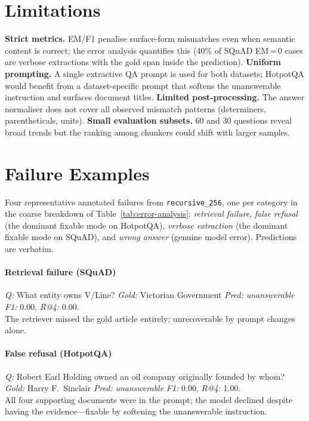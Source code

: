 \documentclass[11pt]{article}
\begin{document}
\section{Limitations}

\textbf{Strict metrics.} EM/F1 penalise surface-form mismatches even when semantic
content is correct; the error analysis quantifies this (40\% of SQuAD EM\,=\,0 cases
are verbose extractions with the gold span inside the prediction).
\textbf{Uniform prompting.} A single extractive QA prompt is used for both datasets;
HotpotQA would benefit from a dataset-specific prompt that softens the unanswerable
instruction and surfaces document titles.
\textbf{Limited post-processing.} The answer normaliser does not cover all observed
mismatch patterns (determiners, parentheticals, units).
\textbf{Small evaluation subsets.} 60 and 30 questions reveal broad trends but the
ranking among chunkers could shift with larger samples.



\appendix

\section{Failure Examples}
\label{app:examples}

Four representative annotated failures from \texttt{recursive\_256}, one per category in
the coarse breakdown of Table~\ref{tab:error-analysis}: \emph{retrieval failure},
\emph{false refusal} (the dominant fixable mode on HotpotQA), \emph{verbose extraction}
(the dominant fixable mode on SQuAD), and \emph{wrong answer} (genuine model error).
Predictions are verbatim.

\paragraph{Retrieval failure (SQuAD)}
\textit{Q:} What entity owns V/Line?
\textit{Gold:} Victorian Government \quad
\textit{Pred:} \textit{unanswerable} \quad
\textit{F1:} 0.00, \textit{R@4:} 0.00.\\
The retriever missed the gold article entirely; unrecoverable by prompt changes alone.

\paragraph{False refusal (HotpotQA)}
\textit{Q:} Robert Earl Holding owned an oil company originally founded by whom?
\textit{Gold:} Harry F.\ Sinclair \quad
\textit{Pred:} \textit{unanswerable} \quad
\textit{F1:} 0.00, \textit{R@4:} 1.00.\\
All four supporting documents were in the prompt; the model declined despite having the
evidence---fixable by softening the unanswerable instruction.
\end{document}
